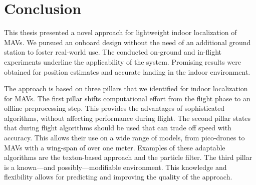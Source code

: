 \chapter{Conclusion}
\label{chap:conclusion}

This thesis presented a novel approach for lightweight indoor
localization of MAVs. We pursued an onboard design without the need of
an additional ground station to foster real-world use. The conducted
on-ground and in-flight experiments underline the applicability of the
system. Promising results were obtained for position estimates and
accurate landing in the indoor environment.

The approach is based on three pillars that we identified for indoor
localization for MAVs. The first pillar shifts computational effort
from the flight phase to an offline preprocessing step. This provides
the advantages of sophisticated algorithms, without affecting
performance during flight. The second pillar states that during flight
algorithms should be used that can trade off speed with accuracy. This
allows their use on a wide range of models, from pico-drones to MAVs
with a wing-span of over one meter. Examples of these adaptable
algorithms are the texton-based approach and the particle filter. The
third pillar is a known---and possibly---modifiable environment. This
knowledge and flexibility allows for predicting and improving the
quality of the approach.
